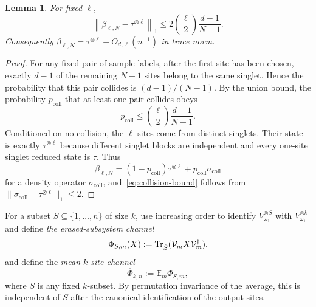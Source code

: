 \documentclass[10pt,twocolumn,superscriptaddress,aps,amsmath,amssymb,citeautoscript,floatfix,prx]{revtex4-2}
\theoremstyle{plain}
\theoremstyle{plain}
\theoremstyle{plain}
\theoremstyle{plain}
\theoremstyle{plain}
\theoremstyle{plain}
\theoremstyle{plain}
\newtheorem{smlemma}[smtheorem]{Lemma}
\theoremstyle{definition}
\theoremstyle{plain}
\begin{document}
\begin{appendix}
\begin{smlemma}
\label{lem:collision}
For fixed $\ell$,
\begin{equation}
\label{eq:collision-bound}
  \left\|\beta_{\ell,N}-\tau^{\otimes\ell}\right\|_1
  \le
  2\binom\ell2\frac{d-1}{N-1}.
\end{equation}
Consequently $\beta_{\ell,N}=\tau^{\otimes\ell}+O_{d,\ell}(n^{-1})$ in trace norm.
\end{smlemma}

\begin{proof}
For any fixed pair of sample labels, after the first site has been chosen, exactly $d-1$ of the remaining $N-1$ sites belong to the same singlet. 
Hence the probability that this pair collides is $(d-1)/(N-1)$. By the union bound, the probability $p_{\mathrm{coll}}$ that at least one pair collides obeys
\[
  p_{\mathrm{coll}}
  \le\binom\ell2\frac{d-1}{N-1}.
\]
Conditioned on no collision, the $\ell$ sites come from distinct singlets. Their state is exactly $\tau^{\otimes\ell}$ because different singlet blocks are independent and every one-site singlet reduced state is $\tau$.
Thus
\[
  \beta_{\ell,N}
  =(1-p_{\mathrm{coll}})\tau^{\otimes\ell}
    +p_{\mathrm{coll}}\sigma_{\mathrm{coll}}
\]
for a density operator $\sigma_{\mathrm{coll}}$, and~\eqref{eq:collision-bound} follows from $\|\sigma_{\mathrm{coll}}-\tau^{\otimes\ell}\|_1\le2$.
\end{proof}

For a subset $S\subseteq\{1,\ldots,n\}$ of size $k$, use increasing order to identify $V_{\omega_1}^{\otimes S}$ with $V_{\omega_1}^{\otimes k}$ and define \textit{the erased-subsystem channel}
\begin{equation}
\label{eq:local-channel}
  \Phi_{S,m}(X)
  :=\Tr_{\hat S}(\mathcal{V}_mX\mathcal{V}_m^\dagger).
\end{equation}
and define the \textit{mean $k$-site channel}
\[
  \overline\Phi_{k,n}
  :=\mathbb{E}_m\Phi_{S,m},
\]
where $S$ is any fixed $k$-subset. By permutation invariance of the average, this is independent of $S$ after the canonical identification of the output sites.


\end{appendix}
\end{document}
